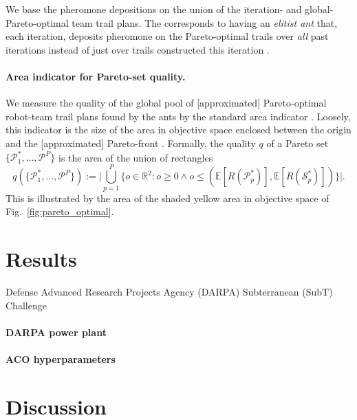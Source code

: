 \documentclass[11pt, oneside]{article}
\begin{document}
We base the pheromone depositions on the union of the iteration- and global-Pareto-optimal team trail plans. The corresponds to having an \emph{elitist ant} that, each iteration, deposits pheromone on the Pareto-optimal trails over \emph{all} past iterations instead of just over trails constructed this iteration \cite{dorigo1996ant}.


\paragraph{Area indicator for Pareto-set quality.}
We measure the quality of the global pool of [approximated] Pareto-optimal robot-team trail plans found by the ants by the standard area indicator \cite{cao2015using,guerreiro2020hypervolume}. Loosely, this indicator is the size of the area in objective space enclosed between the origin and the [approximated] Pareto-front . Formally, the quality $q$ of a Pareto set $\{\mathcal{P}^*_1, ...,\mathcal{P}^P\}$ is the area of the union of rectangles
\begin{equation}
	q(\{\mathcal{P}^*_1, ...,\mathcal{P}^P\}):=
	\Big \lvert 
		\bigcup_{p=1}^P \{ o \in \mathbb{R}^2 : o \geq 0 \wedge  o \leq (\mathbb{E}[R(\mathcal{P}^*_p)], \mathbb{E}[R(\mathcal{S}^*_p)]) \} 
	\Big \rvert.
\end{equation}
This is illustrated by the area of the shaded yellow area in objective space of Fig.~\ref{fig:pareto_optimal}.

\section{Results}

Defense Advanced Research Projects Agency (DARPA) Subterranean (SubT) Challenge \cite{chung2023into}

\paragraph{DARPA power plant}

\paragraph{ACO hyperparameters}



\section{Discussion}
\end{document}
